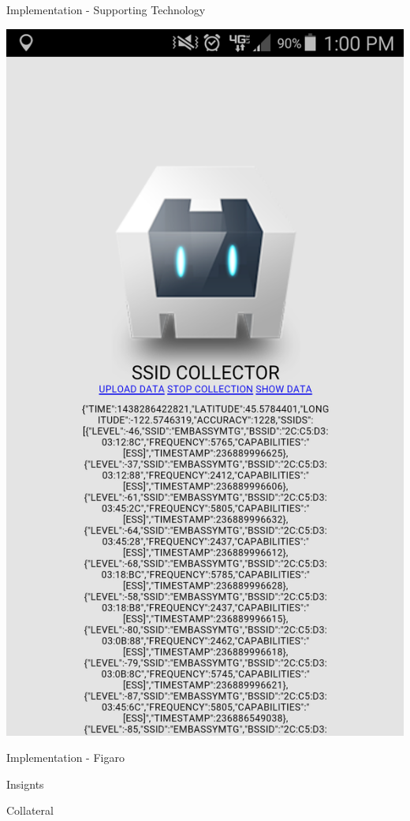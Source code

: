 \documentclass[11pt]{beamer}
\begin{document}
\begin{frame}{Implementation - Supporting Technology}

\includegraphics[height=0.7\textheight]{pictures/phoneapp.png}
\end{frame}

\begin{frame}{Implementation - Figaro}

\end{frame}

\begin{frame}{Insignts}

\end{frame}

\begin{frame}{Collateral}

\end{frame}
\end{document}
